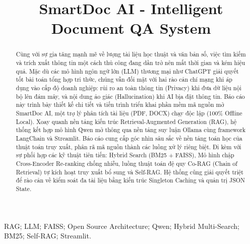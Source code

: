 \documentclass[10pt, conference, a4paper, compsocconf]{IEEEtran}
\begin{document}
\fontsize{10}{12}
\selectfont

\title{{\normalfont\Huge\mdseries SmartDoc AI - Intelligent Document QA System}}

\author{
}

\maketitle

\begin{abstract}
Cùng với sự gia tăng mạnh mẽ về lượng tài liệu học thuật và văn bản số, việc tìm kiếm và trích xuất thông tin một cách thủ công đang dần trở nên mất thời gian và kém hiệu quả. Mặc dù các mô hình ngôn ngữ lớn (LLM) thương mại như ChatGPT giải quyết tốt bài toán tổng hợp tri thức, chúng vẫn đối mặt với hai rào cản chí mạng khi áp dụng vào cấp độ doanh nghiệp: rủi ro an toàn thông tin (Privacy) khi đưa dữ liệu nội bộ lên đám mây, và nội dung ảo giác (Hallucination) khi AI bịa đặt thông tin. Báo cáo này trình bày thiết kế chi tiết và tiến trình triển khai phần mềm mã nguồn mở SmartDoc AI, một trợ lý phân tích tài liệu (PDF, DOCX) chạy độc lập (100\% Offline Local). Xoay quanh nền tảng kiến trúc Retrieval-Augmented Generation (RAG), hệ thống kết hợp mô hình Qwen mở thông qua nền tảng suy luận Ollama cùng framework LangChain và Streamlit. Báo cáo cung cấp góc nhìn sâu sắc về nền tảng toán học của thuật toán truy xuất, phân rã mã nguồn thành các luồng xử lý riêng biệt. Đi kèm với sự phối hợp các kỹ thuật tiên tiến: Hybrid Search (BM25 + FAISS), Mô hình chập Cross-Encoder Re-ranking chống nhiễu, luồng thuật toán đệ quy Co-RAG (Chain of Retrieval) tự kích hoạt truy xuất bổ sung và Self-RAG. Hệ thống cũng giải quyết triệt để rào cản về kiểm soát đa tài liệu bằng kiến trúc Singleton Caching và quản trị JSON State.
\end{abstract}

\begin{IEEEkeywords}
RAG; LLM; FAISS; Open Source Architecture; Qwen; Hybrid Multi-Search; BM25; Self-RAG; Streamlit.
\end{IEEEkeywords}

\IEEEpeerreviewmaketitle
\end{document}

